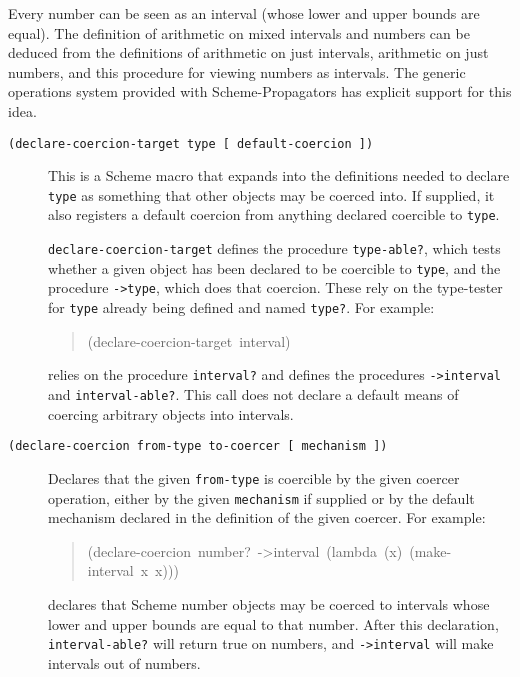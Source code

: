 \documentclass[12pt,letterpaper,english]{article}
\begin{document}
Every number can be seen as an interval (whose lower and upper bounds
are equal).  The definition of arithmetic on mixed intervals and
numbers can be deduced from the definitions of arithmetic on just
intervals, arithmetic on just numbers, and this procedure for viewing
numbers as intervals.  The generic operations system provided with
Scheme-Propagators has explicit support for this idea.
\begin{description}
\item[{\texttt{(declare-coercion-target type {[} default-coercion {]})}}] \leavevmode 
This is a Scheme macro that expands into the definitions needed to
declare \texttt{type} as something that other objects may be coerced
into.  If supplied, it also registers a default coercion from
anything declared coercible to \texttt{type}.

\texttt{declare-coercion-target} defines the procedure \texttt{type-able?},
which tests whether a given object has been declared to be coercible
to \texttt{type}, and the procedure \texttt{->type}, which does that coercion.
These rely on the type-tester for \texttt{type} already being defined and
named \texttt{type?}.  For example:
\begin{quote}{\ttfamily \raggedright \noindent
(declare-coercion-target~interval)
}\end{quote}
relies on the procedure \texttt{interval?} and defines the procedures
\texttt{->interval} and \texttt{interval-able?}.  This call does not declare a
default means of coercing arbitrary objects into intervals.

\item[{\texttt{(declare-coercion from-type to-coercer {[} mechanism {]})}}] \leavevmode 
Declares that the given \texttt{from-type} is coercible by the given
coercer operation, either by the given \texttt{mechanism} if supplied or
by the default mechanism declared in the definition of the given
coercer.  For example:
\begin{quote}{\ttfamily \raggedright \noindent
(declare-coercion~number?~->interval~(lambda~(x)~(make-interval~x~x)))
}\end{quote}
declares that Scheme number objects may be coerced to intervals
whose lower and upper bounds are equal to that number.  After this
declaration, \texttt{interval-able?} will return true on numbers, and
\texttt{->interval} will make intervals out of numbers.


\end{description}
\end{document}

